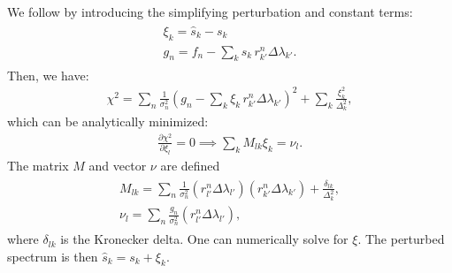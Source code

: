 We follow \citet{Budavari2000b} by introducing the simplifying perturbation and constant terms: 
\begin{align}
    \begin{gathered}
        \xi_k = \hat{s}_k - s_k \\
        g_n = f_n - \sum_k s_k \, r_{k'}^n \Delta\lambda_{k'}.
    \end{gathered}
\end{align} 
Then, we have:
\begin{align}
    \chi^2 = 
    \sum_n \frac{1}{\sigma_n^2} \left( g_n - \sum_k \xi_k \,  r_{k'}^n \Delta\lambda_{k'} \right)^2 +
    \sum_k \frac{\xi_k^2}{\Delta_k^2},
\end{align}
which can be analytically minimized:
\begin{align}
    \frac{\partial \chi^2}{\partial \xi_l} = 0 \implies \sum_k M_{lk} \xi_k = \nu_l.
\end{align}
The matrix $M$ and vector $\nu$ are defined
\begin{align}
    \begin{gathered}
        M_{lk} = \sum_n \frac{1}{\sigma_n^2} (r_{l'}^n \Delta\lambda_{l'}) (r_{k'}^n \Delta\lambda_{k'}) + \frac{\delta_{lk}}{\Delta_k^2}, \\
        \nu_l = \sum_n \frac{g_n}{\sigma_n^2} (r_{l'}^n \Delta\lambda_{l'}),
    \end{gathered}
\end{align}
where $\delta_{lk}$ is the Kronecker delta.
One can numerically solve for $\xi$. 
The perturbed spectrum is then $\hat{s}_k = s_k + \xi_k$. 

